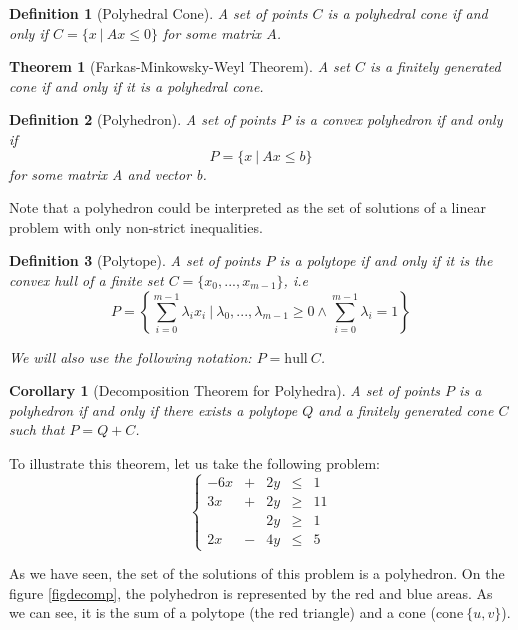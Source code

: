 \documentclass{article}
\newcommand{\cone}{\mathrm{cone}}
\newcommand{\hull}{\mathrm{hull}}
\newcommand{\ifff}{if and only if}
\newtheorem{definition}{Definition}
\newtheorem{theorem}{Theorem}
\newtheorem{corollary}{Corollary}
\begin{document}
\begin{definition}[Polyhedral Cone]
  A set of points $C$ is a \textup{polyhedral cone}
  \ifff{} $C = \{x~|~Ax \leqslant 0\}$ for some matrix $A$.
\end{definition}

\begin{theorem}[Farkas-Minkowsky-Weyl Theorem]
  A set $C$ is a finitely generated cone \ifff{} it is a polyhedral cone.
\end{theorem}

\begin{definition}[Polyhedron]
  A set of points $P$ is a \textup{convex polyhedron} \ifff{}
  $$P = \{x~|~Ax \leqslant b\}$$
  for some matrix A and vector b.
\end{definition}

Note that a polyhedron could be interpreted as the set of solutions of a linear
problem with only non-strict inequalities.

\begin{definition}[Polytope]
  A set of points $P$ is a \textup{polytope} \ifff{} it is the convex hull of a
  finite set $C = \{x_0, ..., x_{m-1}\}$, \textit{i.e}
  $$P = \left\{
    \sum_{i=0}^{m-1} \lambda_i x_i~|~\lambda_0, ..., \lambda_{m-1} \geqslant 0
                                  \wedge \sum_{i=0}^{m-1} \lambda_i = 1
        \right\}$$

  We will also use the following notation: $P = \hull~C$.
\end{definition}

\begin{corollary}[Decomposition Theorem for Polyhedra]
  A set of points $P$ is a polyhedron \ifff{} there exists a polytope $Q$ and a
  finitely generated cone $C$ such that $P = Q + C$.
\end{corollary}

To illustrate this theorem, let us take the following problem:
\begin{equation} \label{eqdecomp}
  \left\{
  \begin{array}{ccccc}
    -6x & + & 2y & \leqslant & 1  \\
    3x  & + & 2y & \geqslant & 11 \\
        &   & 2y & \geqslant & 1  \\
    2x  & - & 4y & \leqslant & 5
  \end{array}
  \right.
\end{equation}

As we have seen, the set of the solutions of this problem is a polyhedron. On
the figure \ref{figdecomp}, the polyhedron is represented by the red and blue
areas. As we can see, it is the sum of a polytope (the red triangle) and a cone
($\cone~\{u, v\}$).
\end{document}
